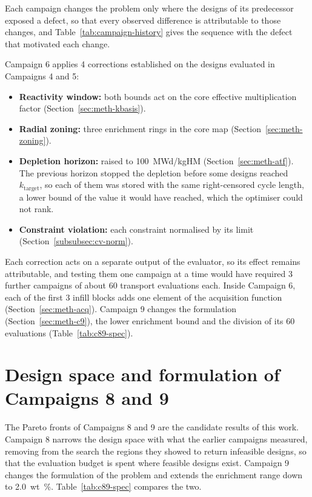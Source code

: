 Each campaign changes the problem only where the designs of its
predecessor exposed a defect, so that every observed difference is
attributable to those changes, and Table~\ref{tab:campaign-history}
gives the sequence with the defect that motivated each change.

Campaign 6 applies 4 corrections established on the designs evaluated
in Campaigns 4 and 5:

\begin{itemize}
  \item \textbf{Reactivity window:} both bounds act on the core effective
        multiplication factor (Section~\ref{sec:meth-kbasis}).
  \item \textbf{Radial zoning:} three enrichment rings in the core map
        (Section~\ref{sec:meth-zoning}).
  \item \textbf{Depletion horizon:} raised to \SI{100}{MWd/kgHM}
        (Section~\ref{sec:meth-atf}). The previous horizon stopped the
        depletion before some designs reached $k_\mathrm{target}$, so each
        of them was stored with the same right-censored cycle length, a
        lower bound of the value it would have reached, which the
        optimiser could not rank.
  \item \textbf{Constraint violation:} each constraint normalised by its
        limit (Section~\ref{subsubsec:cv-norm}).
\end{itemize}

Each correction acts on a separate output of the evaluator, so its
effect remains attributable, and testing them one campaign at a time
would have required 3 further campaigns of about 60 transport
evaluations each. Inside Campaign 6, each of the first 3 infill blocks
adds one element of the acquisition function (Section~\ref{sec:meth-acq}).
Campaign 9 changes the formulation (Section~\ref{sec:meth-c9}), the lower
enrichment bound and the division of its 60 evaluations
(Table~\ref{tab:c89-spec}).

\section{Design space and formulation of Campaigns 8 and 9}
\label{sec:meth-c8-space}

The Pareto fronts of Campaigns 8 and 9 are the candidate results of
this work. Campaign 8 narrows the design space
with what the earlier campaigns measured, removing from the search the
regions they showed to return infeasible designs, so that the
evaluation budget is spent where feasible designs exist. Campaign 9
changes the formulation of the problem and extends the enrichment range
down to \SI{2.0}{wt\%}.
Table~\ref{tab:c89-spec} compares the two.

